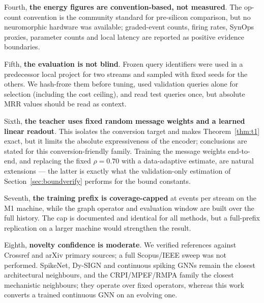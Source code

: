 \documentclass[preprint,12pt]{elsarticle}
\begin{document}
Fourth, \textbf{the energy figures are convention-based, not measured}. The op-count convention \cite{horowitz2014,zhang2025sgnnbench} is the community standard for pre-silicon comparison, but no neuromorphic hardware was available; graded-event counts, firing rates, SynOps proxies, parameter counts and local latency are reported as positive evidence boundaries.

Fifth, \textbf{the evaluation is not blind}. Frozen query identifiers were used in a predecessor local project for two streams and sampled with fixed seeds for the others. We hash-froze them before tuning, used validation queries alone for selection (including the cost ceiling), and read test queries once, but absolute MRR values should be read as context.

Sixth, \textbf{the teacher uses fixed random message weights and a learned linear readout}. This isolates the conversion target and makes Theorem~\ref{thm:t1} exact, but it limits the absolute expressiveness of the encoder; conclusions are stated for this conversion-friendly family. Training the message weights end-to-end, and replacing the fixed $\rho=0.70$ with a data-adaptive estimate, are natural extensions --- the latter is exactly what the validation-only estimation of Section~\ref{sec:boundverify} performs for the bound constants.

Seventh, \textbf{the training prefix is coverage-capped} at \TrainCoverage{} events per stream on the M1 machine, while the graph operator and evaluation window are built over the full history. The cap is documented and identical for all methods, but a full-prefix replication on a larger machine would strengthen the result.

Eighth, \textbf{novelty confidence is moderate}. We verified \NRefs{} references against Crossref and arXiv primary sources; a full Scopus/IEEE sweep was not performed. SpikeNet, Dy-SIGN and continuous spiking GNNs \cite{li2023spikenet,yin2024dysign,li2024continuousgnn} remain the closest architectural neighbours, and the CRPI/MPEF/RMPA family \cite{xu2026crpi,fang2026mpef,chen2026rmpa} the closest mechanistic neighbours; they operate over fixed operators, whereas this work converts a trained continuous GNN on an evolving one.
\end{document}
